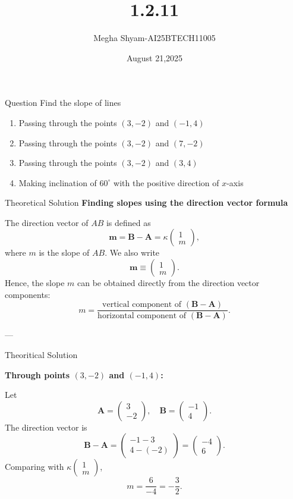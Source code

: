 \documentclass{beamer}
\title %
{1.2.11}
\date{August 21,2025}
\author %
{Megha Shyam-AI25BTECH11005}
\begin{document}
\frame{\titlepage}
\begin{frame}{Question}
 Find the slope of lines
\begin{enumerate}
    \item Passing through the points $(3, -2)$ and $(-1, 4)$
    \item Passing through the points $(3, -2)$ and $(7, -2)$
    \item Passing through the points $(3, -2)$ and $(3, 4)$
    \item Making inclination of $60^\circ$ with the positive direction of $x$-axis
\end{enumerate}
\end{frame}



\begin{frame}{Theoretical Solution}
\textbf{Finding slopes using the direction vector formula}

The direction vector of \(AB\) is defined as  
\[
\mathbf{m} = \mathbf{B} - \mathbf{A} = \kappa \begin{pmatrix}1 \\ m \end{pmatrix},
\]  
where \(m\) is the slope of \(AB\).  
We also write  
\[
\mathbf{m} \equiv \begin{pmatrix}1 \\ m \end{pmatrix}.
\]  
Hence, the slope \(m\) can be obtained directly from the direction vector components:
\[
m = \frac{\text{vertical component of }(\mathbf{B}-\mathbf{A})}
         {\text{horizontal component of }(\mathbf{B}-\mathbf{A})}.
\]

---
\end{frame}
\begin{frame}{Theoritical Solution}
    



   \textbf{Through points \((3,-2)\) and \((-1,4)\):}  

  Let  
  \[
  \mathbf{A}=\begin{pmatrix}3\\-2\end{pmatrix},\quad
  \mathbf{B}=\begin{pmatrix}-1\\4\end{pmatrix}.
  \]  
  The direction vector is  
  \[
  \mathbf{B}-\mathbf{A}
    =\begin{pmatrix}-1-3\\4-(-2)\end{pmatrix}
    =\begin{pmatrix}-4\\6\end{pmatrix}.
  \]  
  Comparing with \(\kappa\begin{pmatrix}1\\m\end{pmatrix}\),  
  \[
  m = \frac{6}{-4} = -\frac{3}{2}.
  \]
  
\end{frame}
\end{document}
